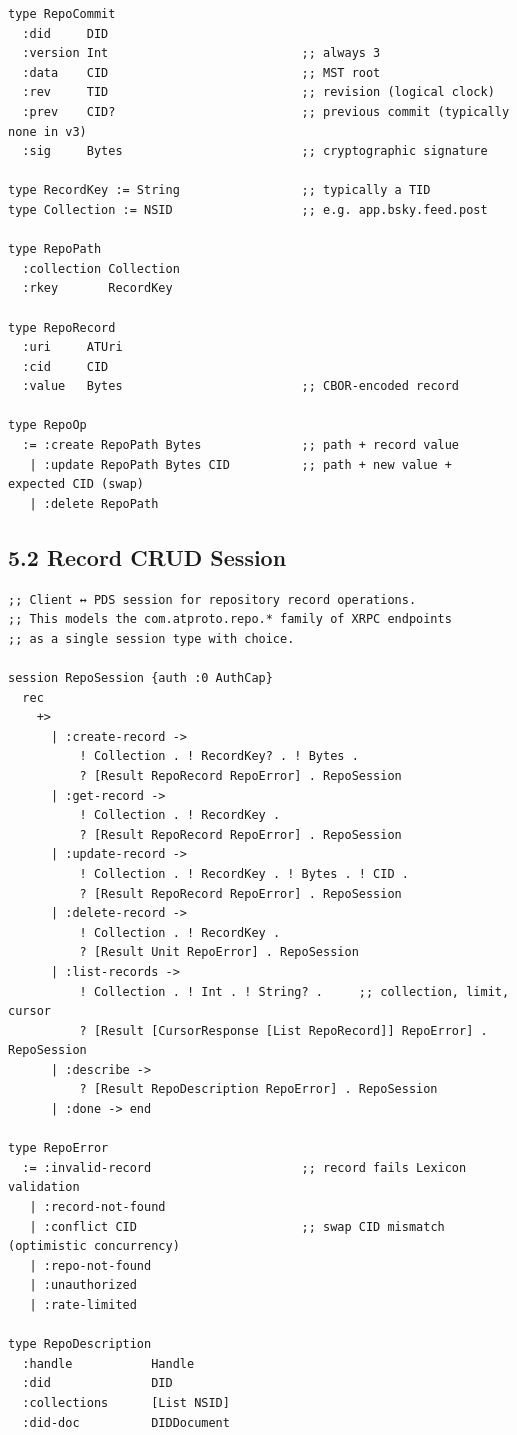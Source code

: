 \documentclass[11pt]{article}
\begin{document}
\begin{verbatim}
type RepoCommit
  :did     DID
  :version Int                           ;; always 3
  :data    CID                           ;; MST root
  :rev     TID                           ;; revision (logical clock)
  :prev    CID?                          ;; previous commit (typically none in v3)
  :sig     Bytes                         ;; cryptographic signature

type RecordKey := String                 ;; typically a TID
type Collection := NSID                  ;; e.g. app.bsky.feed.post

type RepoPath
  :collection Collection
  :rkey       RecordKey

type RepoRecord
  :uri     ATUri
  :cid     CID
  :value   Bytes                         ;; CBOR-encoded record

type RepoOp
  := :create RepoPath Bytes              ;; path + record value
   | :update RepoPath Bytes CID          ;; path + new value + expected CID (swap)
   | :delete RepoPath
\end{verbatim}
\subsection{5.2 Record CRUD Session}
\label{sec:orgd9e98c8}

\begin{verbatim}
;; Client ↔ PDS session for repository record operations.
;; This models the com.atproto.repo.* family of XRPC endpoints
;; as a single session type with choice.

session RepoSession {auth :0 AuthCap}
  rec
    +>
      | :create-record ->
          ! Collection . ! RecordKey? . ! Bytes .
          ? [Result RepoRecord RepoError] . RepoSession
      | :get-record ->
          ! Collection . ! RecordKey .
          ? [Result RepoRecord RepoError] . RepoSession
      | :update-record ->
          ! Collection . ! RecordKey . ! Bytes . ! CID .
          ? [Result RepoRecord RepoError] . RepoSession
      | :delete-record ->
          ! Collection . ! RecordKey .
          ? [Result Unit RepoError] . RepoSession
      | :list-records ->
          ! Collection . ! Int . ! String? .     ;; collection, limit, cursor
          ? [Result [CursorResponse [List RepoRecord]] RepoError] . RepoSession
      | :describe ->
          ? [Result RepoDescription RepoError] . RepoSession
      | :done -> end

type RepoError
  := :invalid-record                     ;; record fails Lexicon validation
   | :record-not-found
   | :conflict CID                       ;; swap CID mismatch (optimistic concurrency)
   | :repo-not-found
   | :unauthorized
   | :rate-limited

type RepoDescription
  :handle           Handle
  :did              DID
  :collections      [List NSID]
  :did-doc          DIDDocument
\end{verbatim}
\end{document}
